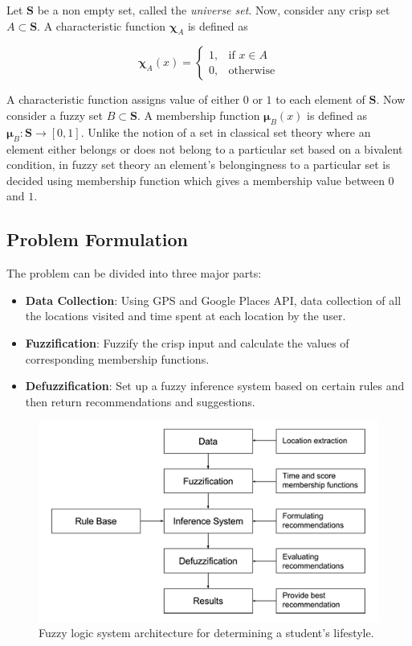 \documentclass[conference]{IEEEtran}
\begin{document}
Let $\mathbf{S}$ be a non empty set, called the \textit{universe set}. Now, consider any crisp set $A \subset \mathbf{S}$. A characteristic function $\mathbold{\chi}_A$ is defined as

$$
\mathbold{\chi}_A(x) = 
\begin{cases}
    1, & \text{if } x\in A\\
    0, & \text{otherwise}
\end{cases}
$$

A characteristic function assigns value of either $0$ or $1$ to each element of $\mathbf{S}$. Now consider a fuzzy set $B \subset \mathbf{S}$. A membership function $\mathbold{\mu}_B(x)$ is defined as $\mathbold{\mu}_B:\mathbf{S}\rightarrow[0, 1]$. Unlike the notion of a set in classical set theory where an element either belongs or does not belong to a particular set based on a bivalent condition, in fuzzy set theory an element\rq s belongingness to a particular set is decided using membership function which gives a membership value between $0$ and $1$.

\subsection{Problem Formulation}

The problem can be divided into three major parts:

\begin{itemize}
\item \textbf{Data Collection}: Using GPS and Google Places API, data collection of all the locations visited and time spent at each location by the user.
\item \textbf{Fuzzification}: Fuzzify the crisp input and calculate the values of corresponding membership functions.
\item \textbf{Defuzzification}: Set up a fuzzy inference system based on certain rules and then return recommendations and suggestions.
\end{itemize}

\begin{figure}[h!]
\centering
\captionsetup{justification=centering}
\noindent \includegraphics[scale=0.45]{fig1-2}
\caption{Fuzzy logic system architecture for determining a student\rq s lifestyle.}
\end{figure}
\end{document}
